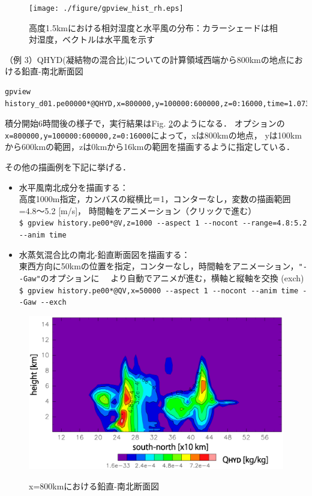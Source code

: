 \begin{figure}[t]
\begin{center}
  \texttt{[image: ./figure/gpview\_hist\_rh.eps]}\\
  \caption{高度1.5kmにおける相対湿度と水平風の分布：カラーシェードは相対湿度，ベクトルは水平風を示す}
  \label{fig:hist_rh}
\end{center}
\end{figure}


（例 3）QHYD(凝結物の混合比)についての計算領域西端から800kmの地点における鉛直-南北断面図

\begin{verbatim}
gpview history_d01.pe00000*@QHYD,x=800000,y=100000:600000,z=0:16000,time=1.0737e+07
\end{verbatim}
積分開始6時間後の様子で，実行結果はFig. \ref{fig:hist_qhyd}のようになる．
オプションの\verb|x=800000,y=100000:600000,z=0:16000|によって，xは800kmの地点，
yは100kmから600kmの範囲，zは0kmから16kmの範囲を描画するように指定している．


その他の描画例を下記に挙げる．
\begin{itemize}

\item 水平風南北成分を描画する：\\
  高度1000m指定，カンバスの縦横比＝1，コンターなし，変数の描画範囲=4.8～5.2 [m/s]，
  時間軸をアニメーション（クリックで進む）\\
  \verb|$ gpview history.pe00*@V,z=1000 --aspect 1 --nocont --range=4.8:5.2 --anim time|

\item 水蒸気混合比の南北-鉛直断面図を描画する：\\
  東西方向に50kmの位置を指定，コンターなし，時間軸をアニメーション，\verb|"--Gaw"|のオプションに
　より自動でアニメが進む，横軸と縦軸を交換 (exch)\\
  \verb|$ gpview history.pe00*@QV,x=50000 --aspect 1 --nocont --anim time --Gaw --exch|

\end{itemize}


\begin{figure}[t]
\begin{center}
  \includegraphics[width=0.7\hsize]{./figure/gpview_hist_qhyd.eps}\\
  \caption{x=800kmにおける鉛直-南北断面図}
  \label{fig:hist_qhyd}
\end{center}
\end{figure}


